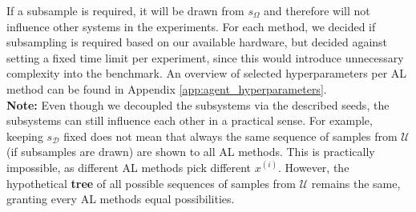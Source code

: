 \documentclass[]{article}
\begin{document}
If a subsample is required, it will be drawn from $s_\Omega$ and therefore will not influence other systems in the experiments.
For each method, we decided if subsampling is required based on our available hardware, but decided against setting a fixed time limit per experiment, since this would introduce unnecessary complexity into the benchmark.
An overview of selected hyperparameters per AL method can be found in Appendix \ref{app:agent_hyperparameters}. \\
\textbf{Note:} Even though we decoupled the subsystems via the described seeds, the subsystems can still influence each other in a practical sense. 
For example, keeping $s_\mathcal{D}$ fixed does not mean that always the same sequence of samples from $\mathcal{U}$ (if subsamples are drawn) are shown to all AL methods. 
This is practically impossible, as different AL methods pick different $x^{(i)}$.
However, the hypothetical \textbf{tree} of all possible sequences of samples from $\mathcal{U}$ remains the same, granting every AL methods equal possibilities.
\end{document}
